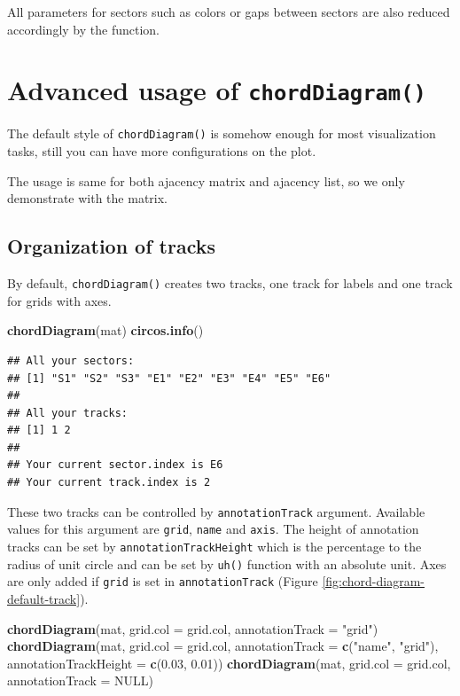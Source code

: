 \documentclass[]{book}
\newenvironment{Shaded}{\begin{snugshade}}{\end{snugshade}}
\newcommand{\KeywordTok}[1]{\textcolor[rgb]{0.13,0.29,0.53}{\textbf{#1}}}
\newcommand{\DataTypeTok}[1]{\textcolor[rgb]{0.13,0.29,0.53}{#1}}
\newcommand{\FloatTok}[1]{\textcolor[rgb]{0.00,0.00,0.81}{#1}}
\newcommand{\StringTok}[1]{\textcolor[rgb]{0.31,0.60,0.02}{#1}}
\newcommand{\OtherTok}[1]{\textcolor[rgb]{0.56,0.35,0.01}{#1}}
\newcommand{\NormalTok}[1]{#1}
\theoremstyle{definition}
\theoremstyle{definition}
\theoremstyle{remark}
\begin{document}
All parameters for sectors such as colors or gaps between sectors are
also reduced accordingly by the function.

\chapter{\texorpdfstring{Advanced usage of
\texttt{chordDiagram()}}{Advanced usage of chordDiagram()}}\label{advanced-usage-of-chorddiagram}

The default style of \texttt{chordDiagram()} is somehow enough for most
visualization tasks, still you can have more configurations on the plot.

The usage is same for both ajacency matrix and ajacency list, so we only
demonstrate with the matrix.

\section{Organization of tracks}\label{organization-of-tracks}

By default, \texttt{chordDiagram()} creates two tracks, one track for
labels and one track for grids with axes.

\begin{Shaded}
\begin{Highlighting}[]
\KeywordTok{chordDiagram}\NormalTok{(mat)}
\KeywordTok{circos.info}\NormalTok{()}
\end{Highlighting}
\end{Shaded}

\begin{verbatim}
## All your sectors:
## [1] "S1" "S2" "S3" "E1" "E2" "E3" "E4" "E5" "E6"
## 
## All your tracks:
## [1] 1 2
## 
## Your current sector.index is E6
## Your current track.index is 2
\end{verbatim}

These two tracks can be controlled by \texttt{annotationTrack} argument.
Available values for this argument are \texttt{grid}, \texttt{name} and
\texttt{axis}. The height of annotation tracks can be set by
\texttt{annotationTrackHeight} which is the percentage to the radius of
unit circle and can be set by \texttt{uh()} function with an absolute
unit. Axes are only added if \texttt{grid} is set in
\texttt{annotationTrack} (Figure \ref{fig:chord-diagram-default-track}).

\begin{Shaded}
\begin{Highlighting}[]
\KeywordTok{chordDiagram}\NormalTok{(mat, }\DataTypeTok{grid.col =}\NormalTok{ grid.col, }\DataTypeTok{annotationTrack =} \StringTok{"grid"}\NormalTok{)}
\KeywordTok{chordDiagram}\NormalTok{(mat, }\DataTypeTok{grid.col =}\NormalTok{ grid.col, }\DataTypeTok{annotationTrack =} \KeywordTok{c}\NormalTok{(}\StringTok{"name"}\NormalTok{, }\StringTok{"grid"}\NormalTok{),}
    \DataTypeTok{annotationTrackHeight =} \KeywordTok{c}\NormalTok{(}\FloatTok{0.03}\NormalTok{, }\FloatTok{0.01}\NormalTok{))}
\KeywordTok{chordDiagram}\NormalTok{(mat, }\DataTypeTok{grid.col =}\NormalTok{ grid.col, }\DataTypeTok{annotationTrack =} \OtherTok{NULL}\NormalTok{)}
\end{Highlighting}
\end{Shaded}
\end{document}
